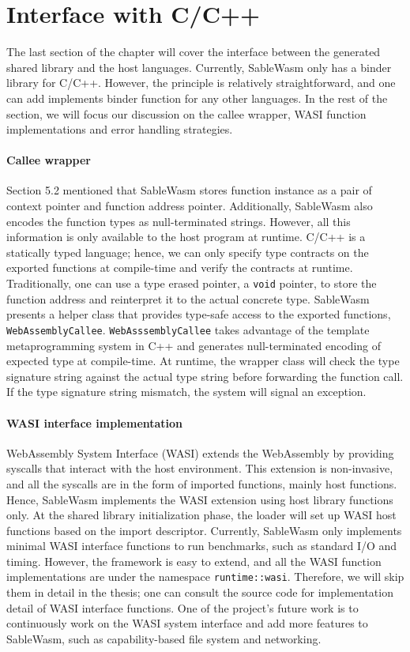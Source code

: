 \section{Interface with C/C++}
The last section of the chapter will cover the interface between the generated shared library and the host languages. Currently, SableWasm only has a binder library for C/C++. However, the principle is relatively straightforward, and one can add implements binder function for any other languages. In the rest of the section, we will focus our discussion on the callee wrapper, WASI function implementations and error handling strategies.

\paragraph{Callee wrapper}
Section 5.2 mentioned that SableWasm stores function instance as a pair of context pointer and function address pointer. Additionally, SableWasm also encodes the function types as null-terminated strings. However, all this information is only available to the host program at runtime. C/C++ is a statically typed language; hence, we can only specify type contracts on the exported functions at compile-time and verify the contracts at runtime. Traditionally, one can use a type erased pointer, a \texttt{void} pointer, to store the function address and reinterpret it to the actual concrete type.  SableWasm presents a helper class that provides type-safe access to the exported functions, \texttt{WebAssemblyCallee}. \texttt{WebAsssemblyCallee} takes advantage of the template metaprogramming system in C++ and generates null-terminated encoding of expected type at compile-time. At runtime, the wrapper class will check the type signature string against the actual type string before forwarding the function call. If the type signature string mismatch, the system will signal an exception.

\paragraph{WASI interface implementation}
WebAssembly System Interface (WASI) extends the WebAssembly by providing syscalls that interact with the host environment. This extension is non-invasive, and all the syscalls are in the form of imported functions, mainly host functions. Hence, SableWasm implements the WASI extension using host library functions only. At the shared library initialization phase, the loader will set up WASI host functions based on the import descriptor. Currently, SableWasm only implements minimal WASI interface functions to run benchmarks, such as standard I/O and timing. However, the framework is easy to extend, and all the WASI function implementations are under the namespace \texttt{runtime::wasi}. Therefore, we will skip them in detail in the thesis; one can consult the source code for implementation detail of WASI interface functions. One of the project's future work is to continuously work on the WASI system interface and add more features to SableWasm, such as capability-based file system and networking.

